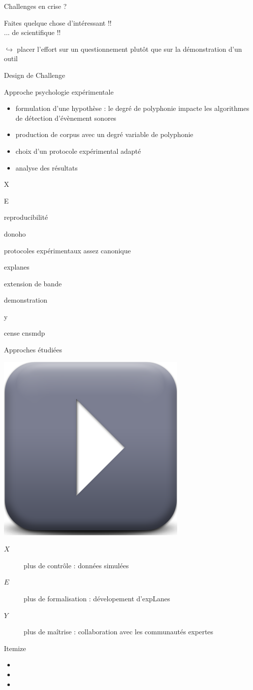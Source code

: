 \begin{frame}{Challenges en crise ?}
\begin{center}
\og Faites quelque chose d'intéressant !! \fg \\ 
\og ... de scientifique !! \fg
\end{center}
$\hookrightarrow{}$ placer l'effort sur un questionnement plutôt que sur la démonstration d'un outil
\end{frame}



\begin{frame}{Design de Challenge}
\begin{block}{Approche  \og psychologie expérimentale \fg}
\begin{itemize}
\item formulation d'une hypothèse : le degré de polyphonie impacte les algorithmes de détection d'évènement sonores
\item production de corpus avec un degré variable de polyphonie
\item choix d'un protocole expérimental adapté
\item analyse des résultats
\end{itemize}
\end{block} 
\end{frame}

X

E

reproducibilité

donoho

protocoles expérimentaux assez canonique

explanes

extension de bande

demonstration

y

cense
cnsmdp



\begin{frame}{Approches étudiées}
\begin{center}
\includegraphics[width=.3\columnwidth]{figures/play} \\
\end{center}
\begin{description}
\item[$X$] plus de contrôle : données simulées
\item[$E$] plus de formalisation : dévelopement d'expLanes
\item[$Y$] plus de maîtrise : collaboration avec les communautés expertes
\end{description}
\end{frame}

\begin{frame}{Itemize}
\begin{itemize}
\item
\item
\item
\end{itemize}
\end{frame}
